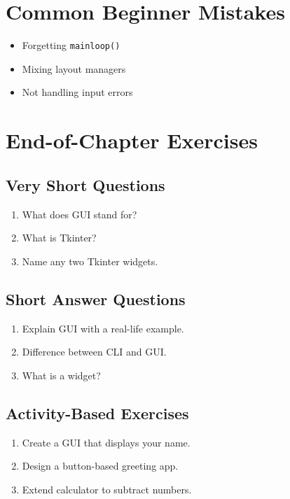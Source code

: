 \section{Common Beginner Mistakes}

\begin{itemize}
    \item Forgetting \texttt{mainloop()}
    \item Mixing layout managers
    \item Not handling input errors
\end{itemize}

\section{End-of-Chapter Exercises}

\subsection{Very Short Questions}

\begin{enumerate}
    \item What does GUI stand for?
    \item What is Tkinter?
    \item Name any two Tkinter widgets.
\end{enumerate}

\subsection{Short Answer Questions}

\begin{enumerate}
    \item Explain GUI with a real-life example.
    \item Difference between CLI and GUI.
    \item What is a widget?
\end{enumerate}

\subsection{Activity-Based Exercises}

\begin{enumerate}
    \item Create a GUI that displays your name.
    \item Design a button-based greeting app.
    \item Extend calculator to subtract numbers.
\end{enumerate}

